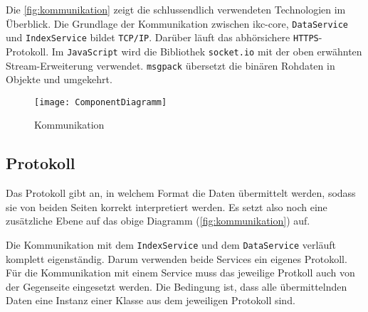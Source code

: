 Die \autoref{fig:kommunikation} zeigt die schlussendlich verwendeten Technologien im Überblick. Die Grundlage der Kommunikation zwischen \gls{ikc-core}, \texttt{DataService} und \texttt{IndexService} bildet \texttt{TCP/IP}. Darüber läuft das abhörsichere \texttt{HTTPS}-Protokoll. Im \texttt{JavaScript} wird die Bibliothek \texttt{socket.io} mit der oben erwähnten \gls{Stream}-Erweiterung verwendet. \texttt{msgpack} übersetzt die binären Rohdaten in Objekte und umgekehrt.



    \begin{figure}[H]
    \centering
    \texttt{[image: ComponentDiagramm]}
    \caption{Kommunikation}
    \label{fig:kommunikation}
    \end{figure}
    


\subsection{Protokoll}\label{section:protokoll}

Das Protokoll gibt an, in welchem Format die Daten übermittelt werden, sodass sie von beiden Seiten korrekt interpretiert werden. Es setzt also noch eine zusätzliche Ebene auf das obige Diagramm (\autoref{fig:kommunikation}) auf.



Die Kommunikation mit dem \texttt{IndexService} und dem \texttt{DataService} verläuft komplett eigenständig. Darum verwenden beide Services ein eigenes Protokoll. Für die Kommunikation mit einem Service muss das jeweilige Protkoll auch von der Gegenseite eingesetzt werden. Die Bedingung ist, dass alle übermittelnden Daten eine Instanz einer Klasse aus dem jeweiligen Protokoll sind.
    

